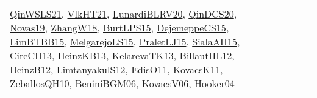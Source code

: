 {\begin{longtable}{llp{6cm}p{6cm}p{6cm}}
\href{articles/QinWSLS21.pdf}{QinWSLS21}\cite{QinWSLS21}, \href{articles/VlkHT21.pdf}{VlkHT21}\cite{VlkHT21}, \href{articles/LunardiBLRV20.pdf}{LunardiBLRV20}\cite{LunardiBLRV20}, \href{articles/QinDCS20.pdf}{QinDCS20}\cite{QinDCS20}, \href{articles/Novas19.pdf}{Novas19}\cite{Novas19}, \href{articles/ZhangW18.pdf}{ZhangW18}\cite{ZhangW18}, \href{papers/BurtLPS15.pdf}{BurtLPS15}\cite{BurtLPS15}, \href{papers/DejemeppeCS15.pdf}{DejemeppeCS15}\cite{DejemeppeCS15}, \href{papers/LimBTBB15.pdf}{LimBTBB15}\cite{LimBTBB15}, \href{papers/MelgarejoLS15.pdf}{MelgarejoLS15}\cite{MelgarejoLS15}, \href{papers/PraletLJ15.pdf}{PraletLJ15}\cite{PraletLJ15}, \href{papers/SialaAH15.pdf}{SialaAH15}\cite{SialaAH15}, \href{papers/CireCH13.pdf}{CireCH13}\cite{CireCH13}, \href{papers/HeinzKB13.pdf}{HeinzKB13}\cite{HeinzKB13}, \href{papers/KelarevaTK13.pdf}{KelarevaTK13}\cite{KelarevaTK13}, \href{papers/BillautHL12.pdf}{BillautHL12}\cite{BillautHL12}, \href{papers/HeinzB12.pdf}{HeinzB12}\cite{HeinzB12}, \href{articles/LimtanyakulS12.pdf}{LimtanyakulS12}\cite{LimtanyakulS12}, \href{papers/EdisO11.pdf}{EdisO11}\cite{EdisO11}, \href{articles/KovacsK11.pdf}{KovacsK11}\cite{KovacsK11}, \href{articles/ZeballosQH10.pdf}{ZeballosQH10}\cite{ZeballosQH10}, \href{papers/BeniniBGM06.pdf}{BeniniBGM06}\cite{BeniniBGM06}, \href{papers/KovacsV06.pdf}{KovacsV06}\cite{KovacsV06}, \href{papers/Hooker04.pdf}{Hooker04}\cite{Hooker04}\\

\end{longtable}}
